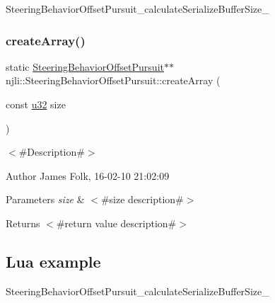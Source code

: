 \begin{DoxyCodeInclude}
\end{DoxyCodeInclude}
Steering\+Behavior\+Offset\+Pursuit\+\_\+calculate\+Serialize\+Buffer\+Size\+\_\+ \mbox{\label{classnjli_1_1_steering_behavior_offset_pursuit_a8f03204a3a873f88951a7c508fa9a399}} 
\subsubsection{\texorpdfstring{create\+Array()}{createArray()}}
{\footnotesize\ttfamily static \mbox{\hyperlink{classnjli_1_1_steering_behavior_offset_pursuit}{Steering\+Behavior\+Offset\+Pursuit}}$\ast$$\ast$ njli\+::\+Steering\+Behavior\+Offset\+Pursuit\+::create\+Array (\begin{DoxyParamCaption}\item[{const \mbox{\hyperlink{_util_8h_a10e94b422ef0c20dcdec20d31a1f5049}{u32}}}]{size }\end{DoxyParamCaption})\hspace{0.3cm}{\ttfamily [static]}}



$<$\#\+Description\#$>$ 

\begin{DoxyAuthor}{Author}
James Folk, 16-\/02-\/10 21\+:02\+:09
\end{DoxyAuthor}

\begin{DoxyParams}{Parameters}
{\em size} & $<$\#size description\#$>$\\
\hline
\end{DoxyParams}
\begin{DoxyReturn}{Returns}
$<$\#return value description\#$>$
\end{DoxyReturn}
\hypertarget{classnjli_1_1_steering_behavior_wander_ex1}{}\subsection{Lua example}\label{classnjli_1_1_steering_behavior_wander_ex1}

\begin{DoxyCodeInclude}
\end{DoxyCodeInclude}
Steering\+Behavior\+Offset\+Pursuit\+\_\+calculate\+Serialize\+Buffer\+Size\+\_\+ \mbox{\label{classnjli_1_1_steering_behavior_offset_pursuit_abe5f7e51560e93559d731e707a5603ad}} 
